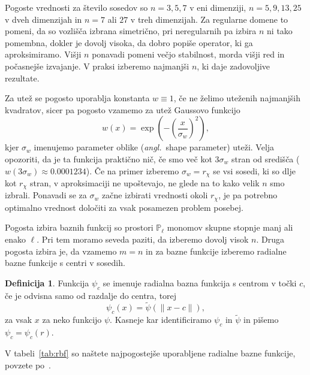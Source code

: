 \documentclass[a4paper,twoside]{article}
\theoremstyle{definition} %
\newtheorem{definicija}{Definicija}[section]
\theoremstyle{plain} %
\numberwithin{equation}{section}
\newcommand{\ang}[1]{(\textit{angl.}\ #1)}
\begin{document}
Pogoste vrednosti za število sosedov so $n = 3, 5, 7$ v eni dimenziji, $n = 5,
9, 13, 25$ v dveh dimenzijah in $n = 7$ ali $27$ v treh dimenzijah. Za regularne
domene to pomeni, da so vozlišča izbrana simetrično, pri neregularnih pa izbira
$n$ ni tako pomembna, dokler je dovolj visoka, da dobro popiše operator, ki ga
aproksimiramo.  Višji $n$ ponavadi pomeni večjo stabilnost, morda višji red in
počasnejše izvajanje. V praksi izberemo najmanjši $n$, ki daje zadovoljive
rezultate.

Za utež se pogosto uporablja konstanta $w\equiv1$, če ne želimo uteženih
najmanjših kvadratov, sicer pa pogosto vzamemo za utež Gaussovo funkcijo
\[
  w(x) = \exp\left(-\left(\frac{x}{\sigma_w}\right)^2 \right),
\]
kjer $\sigma_w$ imenujemo parameter oblike \ang{shape parameter} uteži.
Velja opozoriti, da je ta funkcija praktično nič, če smo več kot $3\sigma_w$
stran od središča ($w(3\sigma_w) \approx 0.0001234$). Če na primer izberemo
$\sigma_w = r_\chi$ se vsi sosedi, ki so dlje kot $r_\chi$ stran, v
aproksimaciji ne upoštevajo, ne glede na to kako velik $n$ smo izbrali.
Ponavadi se za $\sigma_w$ začne izbirati vrednosti okoli $r_\chi$, je
pa potrebno optimalno vrednost določiti za vsak posamezen problem posebej.

Pogosta izbira baznih funkcij so prostori $\mathbb{P}_\ell$ monomov skupne
stopnje manj ali enako $\ell$. Pri tem moramo seveda paziti, da izberemo dovolj
visok $n$. Druga pogosta izbira je, da vzamemo $m = n$ in za bazne funkcije
izberemo radialne bazne funkcije s centri v sosedih.

\begin{definicija}
  Funkcija $\psi_c$ se imenuje radialna bazna funkcija s centrom v točki
  $c$,
  če je odvisna samo od razdalje do centra, torej \[
    \psi_c(x) = \tilde\psi(\|x - c\|),
  \]
  za vsak $x$ za neko funkcijo $\psi$. Kasneje kar identificiramo $\psi_c$
  in $\tilde\psi$ in pišemo $\psi_c = \psi_c(r)$.
\end{definicija}

V tabeli~\ref{tab:rbf} so naštete najpogostejše uporabljene radialne bazne funkcije, povzete
po~\cite[str.\ 5]{schaback1995error}.
\end{document}
